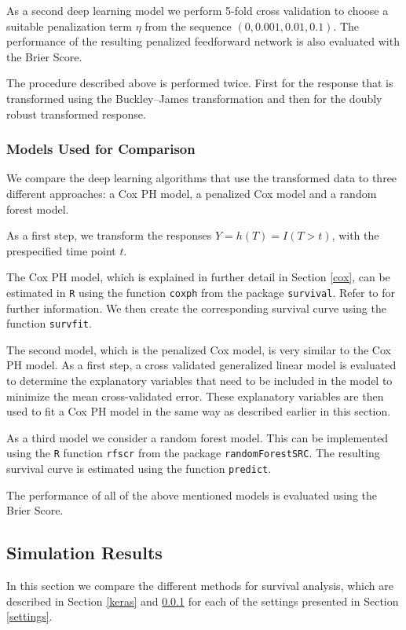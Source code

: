 \documentclass[12pt, a4paper]{scrartcl}
\theoremstyle{definition}
\theoremstyle{plain}
\numberwithin{equation}{section}
\numberwithin{figure}{section}
\numberwithin{table}{section}
\begin{document}
	As a second deep learning model we perform 5-fold cross validation to choose a suitable penalization term $\eta$ from the sequence $(0, 0.001, 0.01, 0.1)$.
	The performance of the resulting penalized feedforward network is also evaluated with the Brier Score.
	
	The procedure described above is performed twice.
	First for the response that is transformed using the Buckley--James transformation and then for the doubly robust transformed response.
	\subsubsection{Models Used for Comparison}\label{comp}
	
	We compare the deep learning algorithms that use the transformed data to three different approaches: a Cox PH model, a penalized Cox model and a random forest model.
	
	As a first step, we transform the responses $Y=h(T)=I(T>t)$, with the prespecified time point $t$.
	
	The Cox PH model, which is explained in further detail in Section \ref{cox}, can be estimated in \texttt{R} using the function \texttt{coxph} from the package \texttt{survival}.
	Refer to \citet*{survival-package} for further information.
	We then create the corresponding survival curve using the function \texttt{survfit}.
	
	The second model, which is the penalized Cox model, is very similar to the Cox PH model.
	As a first step, a cross validated generalized linear model is evaluated to determine the explanatory variables that need to be included in the model to minimize the mean cross-validated error.
	These explanatory variables are then used to fit a Cox PH model in the same way as described earlier in this section.
	
	As a third model we consider a random forest model.
	This can be implemented using the \texttt{R} function \texttt{rfscr} from the package \texttt{randomForestSRC}.
	The resulting survival curve is estimated using the function \texttt{predict}.
	
	The performance of all of the above mentioned models is evaluated using the Brier Score.
	
	
	\subsection{Simulation Results}
	In this section we compare the different methods for survival analysis, which are described in Section \ref{keras} and \ref{comp}  for each of the settings presented in Section \ref{settings}.
	
\end{document}
